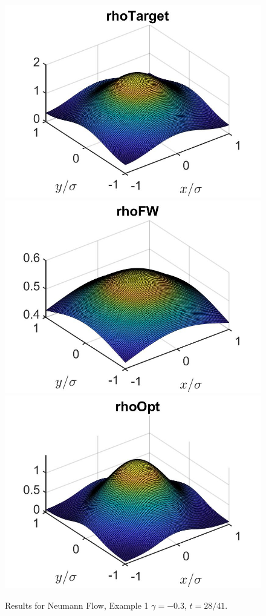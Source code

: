 \documentclass[11pt, a4paper]{article}
\theoremstyle{definition}
\begin{document}
\begin{figure}[h]
	\includegraphics[scale=0.3]{rhoHat2DN2a.jpg}
	\includegraphics[scale=0.3]{rhoFW2DN2a.jpg}
	\includegraphics[scale=0.3]{rhoOpt2DN2a.jpg}
	\caption{Results for Neumann Flow, Example 1 $\gamma = -0.3$, $t = 28/41$.}
	\label{Ex12DN2a}
\end{figure}
\end{document}
